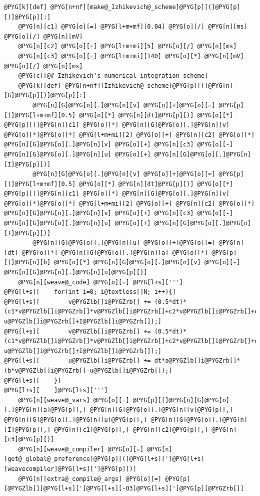\documentclass[letterpaper,10pt,english]{manual}
\begin{document}
\begin{Verbatim}[commandchars=@\[\]]
@PYG[k][def] @PYG[n+nf][make@_Izhikevich@_scheme]@PYG[p][(]@PYG[p][)]@PYG[p][:]
    @PYG[n][c1] @PYG[o][=] @PYG[l+m+mf][0.04] @PYG[o][/] @PYG[n][ms] @PYG[o][/] @PYG[n][mV]
    @PYG[n][c2] @PYG[o][=] @PYG[l+m+mi][5] @PYG[o][/] @PYG[n][ms]
    @PYG[n][c3] @PYG[o][=] @PYG[l+m+mi][140] @PYG[o][*] @PYG[n][mV] @PYG[o][/] @PYG[n][ms]
    @PYG[c][@# Izhikevich's numerical integration scheme]
    @PYG[k][def] @PYG[n+nf][Izhikevich@_scheme]@PYG[p][(]@PYG[n][G]@PYG[p][)]@PYG[p][:]
        @PYG[n][G]@PYG[o][.]@PYG[n][v] @PYG[o][+]@PYG[o][=] @PYG[p][(]@PYG[l+m+mf][0.5] @PYG[o][*] @PYG[n][dt]@PYG[p][)] @PYG[o][*] @PYG[p][(]@PYG[n][c1] @PYG[o][*] @PYG[n][G]@PYG[o][.]@PYG[n][v] @PYG[o][*]@PYG[o][*] @PYG[l+m+mi][2] @PYG[o][+] @PYG[n][c2] @PYG[o][*] @PYG[n][G]@PYG[o][.]@PYG[n][v] @PYG[o][+] @PYG[n][c3] @PYG[o][-] @PYG[n][G]@PYG[o][.]@PYG[n][u] @PYG[o][+] @PYG[n][G]@PYG[o][.]@PYG[n][I]@PYG[p][)]
        @PYG[n][G]@PYG[o][.]@PYG[n][v] @PYG[o][+]@PYG[o][=] @PYG[p][(]@PYG[l+m+mf][0.5] @PYG[o][*] @PYG[n][dt]@PYG[p][)] @PYG[o][*] @PYG[p][(]@PYG[n][c1] @PYG[o][*] @PYG[n][G]@PYG[o][.]@PYG[n][v] @PYG[o][*]@PYG[o][*] @PYG[l+m+mi][2] @PYG[o][+] @PYG[n][c2] @PYG[o][*] @PYG[n][G]@PYG[o][.]@PYG[n][v] @PYG[o][+] @PYG[n][c3] @PYG[o][-] @PYG[n][G]@PYG[o][.]@PYG[n][u] @PYG[o][+] @PYG[n][G]@PYG[o][.]@PYG[n][I]@PYG[p][)]
        @PYG[n][G]@PYG[o][.]@PYG[n][u] @PYG[o][+]@PYG[o][=] @PYG[n][dt] @PYG[o][*] @PYG[n][G]@PYG[o][.]@PYG[n][a] @PYG[o][*] @PYG[p][(]@PYG[n][b] @PYG[o][*] @PYG[n][G]@PYG[o][.]@PYG[n][v] @PYG[o][-] @PYG[n][G]@PYG[o][.]@PYG[n][u]@PYG[p][)]
    @PYG[n][weave@_code] @PYG[o][=] @PYG[l+s][''']
@PYG[l+s][    for(int i=0; i@textless[]N; i++){]
@PYG[l+s][        v@PYGZlb[]i@PYGZrb[] += (0.5*dt)*(c1*v@PYGZlb[]i@PYGZrb[]*v@PYGZlb[]i@PYGZrb[]+c2*v@PYGZlb[]i@PYGZrb[]+c3-u@PYGZlb[]i@PYGZrb[]+I@PYGZlb[]i@PYGZrb[]);]
@PYG[l+s][        v@PYGZlb[]i@PYGZrb[] += (0.5*dt)*(c1*v@PYGZlb[]i@PYGZrb[]*v@PYGZlb[]i@PYGZrb[]+c2*v@PYGZlb[]i@PYGZrb[]+c3-u@PYGZlb[]i@PYGZrb[]+I@PYGZlb[]i@PYGZrb[]);]
@PYG[l+s][        u@PYGZlb[]i@PYGZrb[] += dt*a@PYGZlb[]i@PYGZrb[]*(b*v@PYGZlb[]i@PYGZrb[]-u@PYGZlb[]i@PYGZrb[]);]
@PYG[l+s][    }]
@PYG[l+s][    ]@PYG[l+s][''']
    @PYG[n][weave@_vars] @PYG[o][=] @PYG[p][(]@PYG[n][G]@PYG[o][.]@PYG[n][a]@PYG[p][,] @PYG[n][G]@PYG[o][.]@PYG[n][v]@PYG[p][,] @PYG[n][G]@PYG[o][.]@PYG[n][u]@PYG[p][,] @PYG[n][G]@PYG[o][.]@PYG[n][I]@PYG[p][,] @PYG[n][c1]@PYG[p][,] @PYG[n][c2]@PYG[p][,] @PYG[n][c3]@PYG[p][)]
    @PYG[n][weave@_compiler] @PYG[o][=] @PYG[n][get@_global@_preference]@PYG[p][(]@PYG[l+s][']@PYG[l+s][weavecompiler]@PYG[l+s][']@PYG[p][)]
    @PYG[n][extra@_compile@_args] @PYG[o][=] @PYG[p][@PYGZlb[]]@PYG[l+s][']@PYG[l+s][-O3]@PYG[l+s][']@PYG[p][@PYGZrb[]]

\end{Verbatim}
\end{document}
